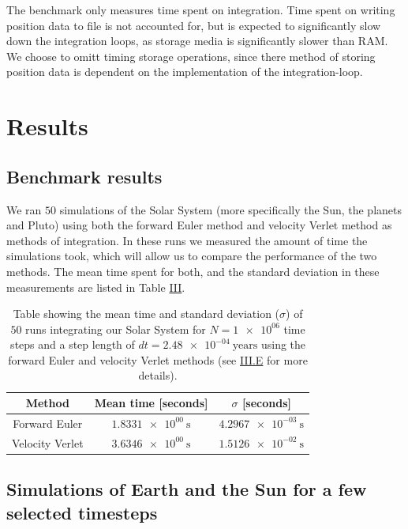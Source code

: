 \documentclass[reprint,english,notitlepage]{revtex4-1}  %
\begin{document}
The benchmark only measures time spent on integration. Time spent on writing position data to file is not accounted for, but is expected to significantly slow down the integration loops, as storage media is significantly slower than RAM. We choose to omitt timing storage operations, since there method of storing position data is dependent on the implementation of the integration-loop.

\newpage

\section{Results} \label{sec:IV}

\subsection{Benchmark results} \label{sec:IV:a}

We ran $50$ simulations of the Solar System (more specifically the Sun, the planets and Pluto) using both the forward Euler method and velocity Verlet method as methods of integration. In these runs we measured the amount of time the simulations took, which will allow us to compare the performance of the two methods. The mean time spent for both, and the standard deviation in these measurements are listed in Table \hyperref[table:benchmark]{III}.

\begin{table}[H] 
\caption{Table showing the mean time and standard deviation ($\sigma$) of \(50\) runs integrating our Solar System for \(N = \num{1e+06}\) time steps and a step length of \(dt = \SI{2.48e-04}{\text{years}}\) using the forward Euler and velocity Verlet methods (see \hyperref[sec:III:e]{III.E} for more details).}
\begin{tabular}{|c|c|c|}
\hline
Method & Mean time [seconds] & $\sigma$ [seconds] \\
\hline 
Forward Euler & \(\SI{1.8331e+00}{\second}\) & \(\SI{4.2967e-03}{\second}\) \\
Velocity Verlet &  \(\SI{3.6346e+00}{\second}\) & \(\SI{1.5126e-02}{\second}\)\\
\hline
\end{tabular}
\label{table:benchmark}
\end{table} 

\subsection{Simulations of Earth and the Sun for a few selected timesteps} \label{sec:IV:b}
\end{document}
